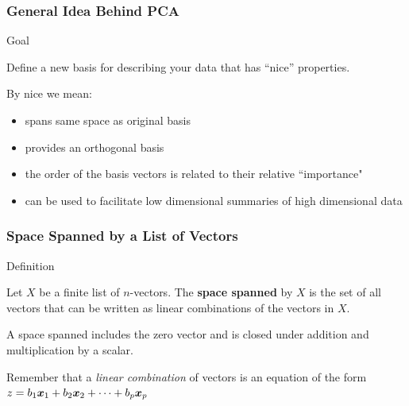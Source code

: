 \documentclass{beamer}
\begin{document}
\begin{frame}
  \frametitle{General Idea Behind PCA}


\begin{block}{Goal}

Define a new basis for describing your data that has ``nice'' properties.

\end{block}
\medskip

By nice we mean:
\begin{itemize}
    \item spans same space as original basis
    \item provides an orthogonal basis
    \item the order of the basis vectors is related to their relative ``importance"
    \item can be used to facilitate low dimensional summaries of high dimensional data
\end{itemize}


\end{frame}



\begin{frame}
  \frametitle{Space Spanned by a List of Vectors}


\begin{block}{Definition}

Let $X$ be a finite list of $n$-vectors. The \textbf{space spanned} by $X$ is the set of all vectors that can be written as linear combinations of the vectors in $X$.
\medskip

A space spanned includes the zero vector and is closed under addition and multiplication by a scalar.

\end{block}
\bigskip

Remember that a \emph{linear combination} of vectors is an equation of the form $z = b_1 \bm{x}_1 + b_2 \bm{x}_2 + \cdots + b_p \bm{x}_p$

\end{frame}

\end{document}
